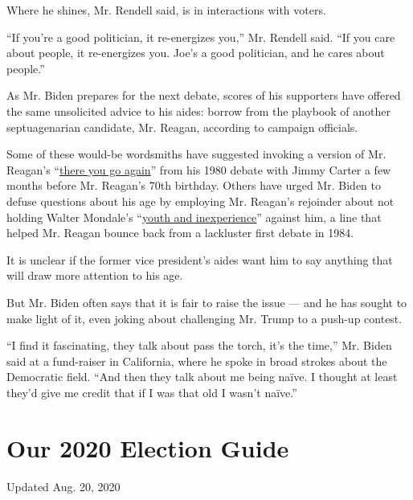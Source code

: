 Where he shines, Mr. Rendell said, is in interactions with voters.

``If you're a good politician, it re-energizes you,'' Mr. Rendell said.
``If you care about people, it re-energizes you. Joe's a good
politician, and he cares about people.''

As Mr. Biden prepares for the next debate, scores of his supporters have
offered the same unsolicited advice to his aides: borrow from the
playbook of another septuagenarian candidate, Mr. Reagan, according to
campaign officials.

Some of these would-be wordsmiths have suggested invoking a version of
Mr. Reagan's
``\href{https://www.realclearpolitics.com/lists/debatemoments/reagan_carter.html}{there
you go again}'' from his 1980 debate with Jimmy Carter a few months
before Mr. Reagan's 70th birthday. Others have urged Mr. Biden to defuse
questions about his age by employing Mr. Reagan's rejoinder about not
holding Walter Mondale's
``\href{https://www.youtube.com/watch?v=22Lr4fgSFAY}{youth and
inexperience}'' against him, a line that helped Mr. Reagan bounce back
from a lackluster first debate in 1984.

It is unclear if the former vice president's aides want him to say
anything that will draw more attention to his age.

But Mr. Biden often says that it is fair to raise the issue --- and he
has sought to make light of it, even joking about challenging Mr. Trump
to a push-up contest.

``I find it fascinating, they talk about pass the torch, it's the
time,'' Mr. Biden said at a fund-raiser in California, where he spoke in
broad strokes about the Democratic field. ``And then they talk about me
being naïve. I thought at least they'd give me credit that if I was that
old I wasn't naïve.''

\hypertarget{our-2020-election-guide}{%
\section{Our 2020 Election Guide}\label{our-2020-election-guide}}

Updated Aug. 20, 2020

